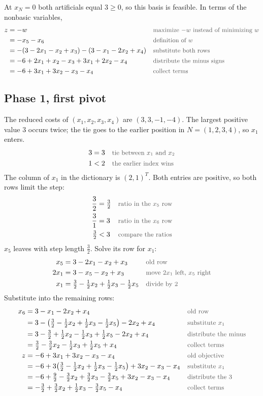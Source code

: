\documentclass[a4paper,11pt]{article}
\newif\ifexplain
\newcommand{\teil}[1]{\subsection*{#1}}
\newcommand{\why}[1]{\text{\small\color{black!65}#1}}
\newcommand{\explain}[1]{\ifexplain\begin{erklbox}#1\end{erklbox}\fi}
\begin{document}
At $x_N=0$ both artificials equal $3\geq 0$, so this basis is feasible. In terms of the nonbasic variables,
\begin{align*}
z&=-w&&\why{maximize $-w$ instead of minimizing $w$}\\
&=-x_5-x_6&&\why{definition of $w$}\\
&=-(3-2x_1-x_2+x_3)-(3-x_1-2x_2+x_4)&&\why{substitute both rows}\\
&=-6+2x_1+x_2-x_3+3x_1+2x_2-x_4&&\why{distribute the minus signs}\\
&=-6+3x_1+3x_2-x_3-x_4&&\why{collect terms}
\end{align*}
\explain{Nach Einsetzen der künstlichen Variablen als Basis ist das Startdictionary zulässig: $x_5=x_6=3$ erfüllt beide Gleichungen. Die Zielfunktion $w$ zählt, wie viel Künstliches noch drinsteckt. Solange $w>0$, ist die aktuelle Lösung keine zulässige Lösung des Originalproblems.}
\teil{Phase 1, first pivot}
The reduced costs of $(x_1,x_2,x_3,x_4)$ are $(3,3,-1,-4)$. The largest positive value $3$ occurs twice; the tie goes to the earlier position in $N=(1,2,3,4)$, so $x_1$ enters.
\begin{align*}
3&=3&&\why{tie between $x_1$ and $x_2$}\\
1&<2&&\why{the earlier index wins}
\end{align*}
The column of $x_1$ in the dictionary is $(2,1)^T$. Both entries are positive, so both rows limit the step:
\begin{align*}
\frac{3}{2}&=\tfrac32&&\why{ratio in the $x_5$ row}\\
\frac{3}{1}&=3&&\why{ratio in the $x_6$ row}\\
\tfrac32&<3&&\why{compare the ratios}
\end{align*}
$x_5$ leaves with step length $\tfrac32$. Solve its row for $x_1$:
\begin{align*}
x_5&=3-2x_1-x_2+x_3&&\why{old row}\\
2x_1&=3-x_5-x_2+x_3&&\why{move $2x_1$ left, $x_5$ right}\\
x_1&=\tfrac32-\tfrac12x_2+\tfrac12x_3-\tfrac12x_5&&\why{divide by $2$}
\end{align*}
Substitute into the remaining rows:
\begin{align*}
x_6&=3-x_1-2x_2+x_4&&\why{old row}\\
&=3-\bigl(\tfrac32-\tfrac12x_2+\tfrac12x_3-\tfrac12x_5\bigr)-2x_2+x_4&&\why{substitute $x_1$}\\
&=3-\tfrac32+\tfrac12x_2-\tfrac12x_3+\tfrac12x_5-2x_2+x_4&&\why{distribute the minus}\\
&=\tfrac32-\tfrac32x_2-\tfrac12x_3+\tfrac12x_5+x_4&&\why{collect terms}\\
z&=-6+3x_1+3x_2-x_3-x_4&&\why{old objective}\\
&=-6+3\bigl(\tfrac32-\tfrac12x_2+\tfrac12x_3-\tfrac12x_5\bigr)+3x_2-x_3-x_4&&\why{substitute $x_1$}\\
&=-6+\tfrac92-\tfrac32x_2+\tfrac32x_3-\tfrac32x_5+3x_2-x_3-x_4&&\why{distribute the $3$}\\
&=-\tfrac32+\tfrac32x_2+\tfrac12x_3-\tfrac32x_5-x_4&&\why{collect terms}
\end{align*}
\end{document}
